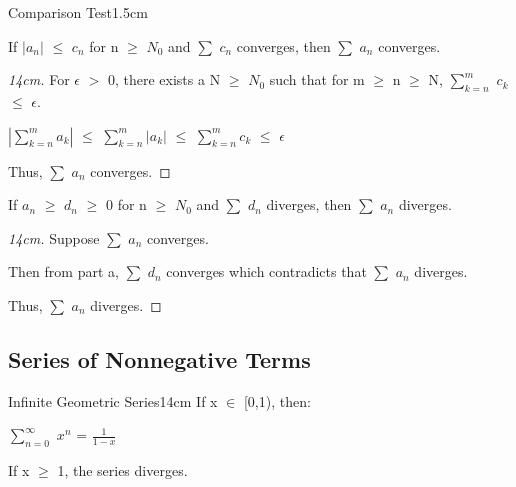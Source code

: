     \begin{ltheorem}{Comparison Test}{1.5cm}
        \item If $|a_n|$ $\leq$ $c_n$ for n $\geq$ $N_0$ and
            $\sum$ $c_n$ converges, then $\sum$ $a_n$ converges.

            \begin{proof}[14cm]
                For $\epsilon$ $>$ 0, there exists a N $\geq$ $N_0$
                such that for m $\geq$ n $\geq$ N,
                $\sum_{k=n}^m$ $c_k$ $\leq$ $\epsilon$.

                \hspace{1cm}
                $| \sum_{k=n}^m a_k |$
                $\leq$ $\sum_{k=n}^m |a_k|$
                $\leq$ $\sum_{k=n}^m c_k$ $\leq$ $\epsilon$

                Thus, $\sum$ $a_n$ converges.
            \end{proof}
        
        \item If $a_n$ $\geq$ $d_n$ $\geq$ 0 for n $\geq$ $N_0$
            and $\sum$ $d_n$ diverges, then $\sum$ $a_n$ diverges.

            \begin{proof}[14cm]
                Suppose $\sum$ $a_n$ converges.

                Then from part a, $\sum$ $d_n$ converges which contradicts
                that $\sum$ $a_n$ diverges.
                
                Thus, $\sum$ $a_n$ diverges.
            \end{proof}
    \end{ltheorem}

    \vspace{0.5cm}





\subsection{ Series of Nonnegative Terms }

    \begin{wtheorem}{Infinite Geometric Series}{14cm}
        If x $\in$ [0,1), then:

        \hspace{1cm}
        $\sum_{n=0}^{\infty}$ $x^n$
        = {\large $\frac{1}{1-x}$ }

        If x $\geq$ 1, the series diverges.
    \end{wtheorem}
    
